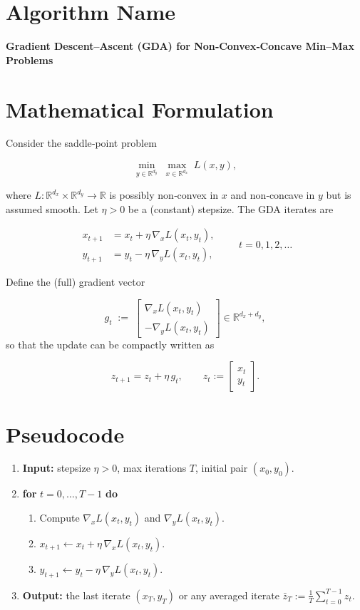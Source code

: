 \documentclass{article}
\newcommand{\grad}{\nabla}
\newcommand{\R}{\mathbb{R}}
\begin{document}
\section*{Algorithm Name}
\textbf{Gradient Descent–Ascent (GDA) for Non‑Convex‑Concave Min–Max Problems}

\section*{Mathematical Formulation}
Consider the saddle‑point problem  

\[
\min_{y\in \R^{d_y}}\;\max_{x\in \R^{d_x}} \;L(x,y),
\]

where $L:\R^{d_x}\times\R^{d_y}\rightarrow\R$ is possibly non‑convex in $x$ and non‑concave in $y$ but is assumed smooth.  
Let $\eta>0$ be a (constant) stepsize.  The GDA iterates are  

\[
\boxed{
\begin{aligned}
x_{t+1} &= x_{t}+ \eta\,\grad_{x}L(x_{t},y_{t}),\\[4pt]
y_{t+1} &= y_{t}- \eta\,\grad_{y}L(x_{t},y_{t}),
\end{aligned}}
\qquad t=0,1,2,\dots
\]

Define the (full) gradient vector  

\[
g_t \;:=\; 
\begin{bmatrix}
\grad_{x}L(x_{t},y_{t})\\[2pt]
-\grad_{y}L(x_{t},y_{t})
\end{bmatrix}
\in\R^{d_x+d_y},
\]
so that the update can be compactly written as  

\[
z_{t+1}=z_{t}+ \eta\, g_t,\qquad 
z_t:=\begin{bmatrix}x_t\\ y_t\end{bmatrix}.
\]

\section*{Pseudocode}
\begin{enumerate}[leftmargin=*]
\item \textbf{Input:} stepsize $\eta>0$, max iterations $T$, initial pair $(x_0,y_0)$.
\item \textbf{for} $t=0,\dots,T-1$ \textbf{do}
    \begin{enumerate}
        \item Compute $\grad_{x}L(x_t,y_t)$ and $\grad_{y}L(x_t,y_t)$.
        \item $x_{t+1}\gets x_t+\eta\,\grad_{x}L(x_t,y_t)$.
        \item $y_{t+1}\gets y_t-\eta\,\grad_{y}L(x_t,y_t)$.
    \end{enumerate}
\item \textbf{Output:} the last iterate $(x_T,y_T)$ or any averaged iterate $\bar z_T:=\frac1T\sum_{t=0}^{T-1}z_t$.
\end{enumerate}
\end{document}

